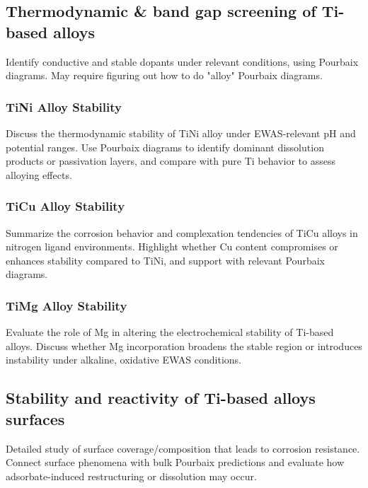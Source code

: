 \subsection{Thermodynamic \& band gap screening of Ti-based alloys}
Identify conductive and stable dopants under relevant conditions, using Pourbaix diagrams. May require figuring out how to do "alloy" Pourbaix diagrams.

\subsubsection{TiNi Alloy Stability}
Discuss the thermodynamic stability of TiNi alloy under EWAS-relevant pH and potential ranges. Use Pourbaix diagrams to identify dominant dissolution products or passivation layers, and compare with pure Ti behavior to assess alloying effects.

\subsubsection{TiCu Alloy Stability}
Summarize the corrosion behavior and complexation tendencies of TiCu alloys in nitrogen ligand environments. Highlight whether Cu content compromises or enhances stability compared to TiNi, and support with relevant Pourbaix diagrams.

\subsubsection{TiMg Alloy Stability}
Evaluate the role of Mg in altering the electrochemical stability of Ti-based alloys. Discuss whether Mg incorporation broadens the stable region or introduces instability under alkaline, oxidative EWAS conditions.



\subsection{Stability and reactivity of Ti-based alloys surfaces}
Detailed study of surface coverage/composition that leads to corrosion resistance. Connect surface phenomena with bulk Pourbaix predictions and evaluate how adsorbate-induced restructuring or dissolution may occur.

